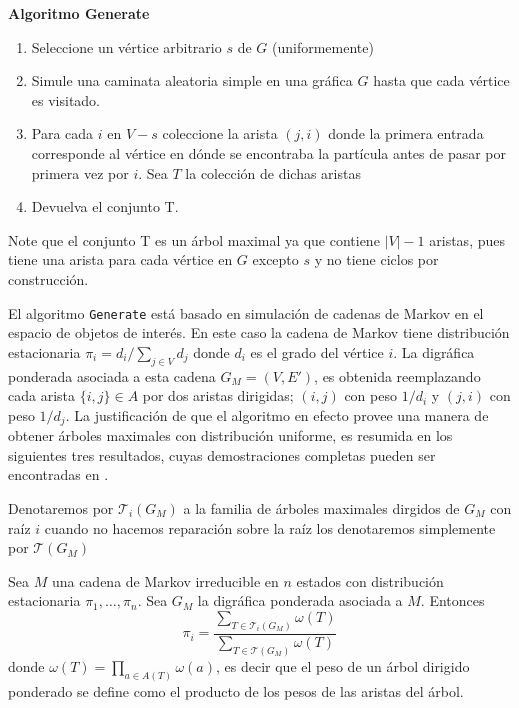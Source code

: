 \begin{cajita}
\textbf{Algoritmo Generate}
\begin{enumerate}
\item Seleccione un vértice arbitrario $s$ de $G$ (uniformemente)
\item Simule una caminata aleatoria simple en una gráfica $G$ hasta que cada vértice es visitado.
\item Para cada $i$ en $V-s$ coleccione la arista $(j,i)$ donde la primera entrada corresponde al vértice en dónde se encontraba la partícula antes de pasar por primera vez por $i$. Sea $T$ la colección de dichas aristas
\item Devuelva el conjunto T.
\end{enumerate}
\end{cajita}

Note que el conjunto T es un árbol maximal ya que contiene $|V| - 1$ aristas, pues tiene una arista para cada vértice en $G$ excepto $s$ y no tiene ciclos por construcción.

El algoritmo \texttt{Generate} está basado en simulación de cadenas de Markov en el espacio de objetos de interés. En este caso la cadena de Markov tiene distribución estacionaria $\pi_{i}=d_{i}/\sum_{j\in V} d_{j}$ donde $d_{i}$ es el grado del vértice $i$. La digráfica ponderada asociada a esta cadena $G_M =(V,E')$, es obtenida reemplazando cada arista $\{i,j\}\in A$ por dos aristas dirigidas; $(i,j)$ con peso $1/d_{i}$ y $(j,i)$ con peso $1/d_{j}$. La justificación de que el algoritmo en efecto provee una manera de obtener árboles maximales con distribución uniforme, es resumida en los siguientes tres resultados, cuyas demostraciones completas pueden ser encontradas en \cite{Broder89}.

Denotaremos por $\mathcal{T}_{i}(G_{M})$ a la familia de árboles maximales dirgidos de $G_{M}$ con raíz $i$ cuando no hacemos reparación sobre la raíz los denotaremos simplemente por $\mathcal{T}(G_{M})$ 

\begin{theorem}
Sea $M$ una cadena de Markov irreducible en $n$ estados con distribución estacionaria $\pi_1, \dots, \pi_n$. Sea $G_{M}$ la digráfica ponderada asociada a $M$. Entonces
$$\pi_{i} = \frac{\sum_{ T \in \mathcal{T}_{i}(G_{M})} \omega (T)}{\sum _{T \in \mathcal{T}(G_{M})} \omega (T)}$$
donde $\omega(T) = \prod_{a\in A(T)}\omega(a)$, es decir que el peso de un árbol dirigido ponderado se define como el producto de los pesos de las aristas del árbol. 
\end{theorem}


